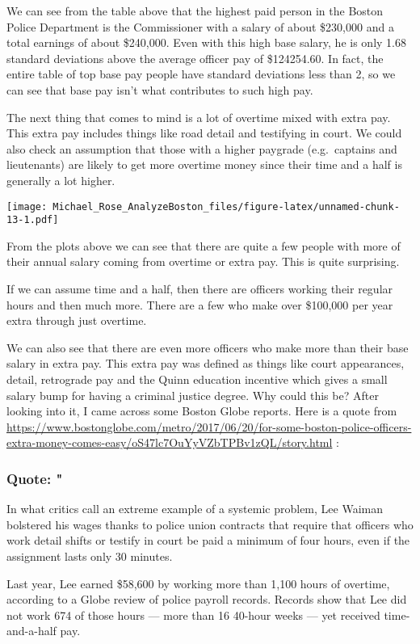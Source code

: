 \documentclass[]{article}
\begin{document}
We can see from the table above that the highest paid person in the
Boston Police Department is the Commissioner with a salary of about
\$230,000 and a total earnings of about \$240,000. Even with this high
base salary, he is only 1.68 standard deviations above the average
officer pay of \$124254.60. In fact, the entire table of top base pay
people have standard deviations less than 2, so we can see that base pay
isn't what contributes to such high pay.

The next thing that comes to mind is a lot of overtime mixed with extra
pay. This extra pay includes things like road detail and testifying in
court. We could also check an assumption that those with a higher
paygrade (e.g.~captains and lieutenants) are likely to get more overtime
money since their time and a half is generally a lot higher.

\texttt{[image: Michael\_Rose\_AnalyzeBoston\_files/figure-latex/unnamed-chunk-13-1.pdf]}

From the plots above we can see that there are quite a few people with
more of their annual salary coming from overtime or extra pay. This is
quite surprising.

If we can assume time and a half, then there are officers working their
regular hours and then much more. There are a few who make over
\$100,000 per year extra through just overtime.

We can also see that there are even more officers who make more than
their base salary in extra pay. This extra pay was defined as things
like court appearances, detail, retrograde pay and the Quinn education
incentive which gives a small salary bump for having a criminal justice
degree. Why could this be? After looking into it, I came across some
Boston Globe reports. Here is a quote from
\url{https://www.bostonglobe.com/metro/2017/06/20/for-some-boston-police-officers-extra-money-comes-easy/oS47lc7OuYyVZbTPBv1zQL/story.html}
:

\subsubsection{Quote: "}\label{quote}

In what critics call an extreme example of a systemic problem, Lee
Waiman bolstered his wages thanks to police union contracts that require
that officers who work detail shifts or testify in court be paid a
minimum of four hours, even if the assignment lasts only 30 minutes.

Last year, Lee earned \$58,600 by working more than 1,100 hours of
overtime, according to a Globe review of police payroll records. Records
show that Lee did not work 674 of those hours --- more than 16 40-hour
weeks --- yet received time-and-a-half pay.
\end{document}
